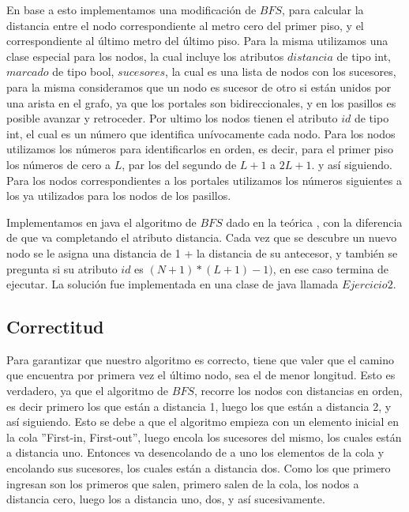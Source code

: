 En base a esto implementamos una modificación de $ BFS $, para calcular la distancia entre el nodo correspondiente al metro cero del primer piso, y el correspondiente al último metro del último piso. Para la misma utilizamos una clase especial para los nodos, la cual incluye los atributos $ distancia $ de tipo int, $  marcado$ de tipo bool, $ sucesores $, la cual es una lista de nodos con los sucesores, para la misma consideramos que un nodo es sucesor de otro si están unidos por una arista en el grafo, ya que los portales son bidireccionales, y en los pasillos es posible avanzar y retroceder. Por ultimo los nodos tienen el atributo $ id $ de tipo int, el cual es un número que identifica unívocamente cada nodo. Para los nodos utilizamos los números para identificarlos en orden, es decir, para el primer piso  los números de cero a $ L $, par los del segundo de $ L+1 $ a $ 2L+1 $. y así siguiendo. Para los nodos correspondientes a los portales utilizamos los números siguientes a los ya utilizados para los nodos de los pasillos.

Implementamos en java el algoritmo de $ BFS $ dado en la teórica \cite{teorica}, con la diferencia de que va completando el atributo distancia. Cada vez que se descubre un nuevo nodo se le asigna una distancia de 1 + la distancia de su antecesor, y también se pregunta si su atributo $ id $ es $(N+1)*(L+1)-1)$, en ese caso termina de ejecutar. La solución fue implementada en una clase de java llamada $ Ejercicio2 $.



\subsection{Correctitud}

Para garantizar que nuestro algoritmo es correcto, tiene que valer que el camino que encuentra por primera vez el último nodo, sea el de menor longitud. Esto es verdadero, ya que el algoritmo de $ BFS $, recorre los nodos con distancias en orden, es decir primero los que están a distancia 1, luego los que están a distancia 2, y así siguiendo. Esto se debe a que el algoritmo empieza con un elemento inicial en la cola ''First-in, First-out'', luego encola los sucesores del mismo, los cuales están a distancia uno. Entonces va desencolando de a uno los elementos de la cola y encolando sus sucesores, los cuales están a distancia dos. Como los que primero ingresan son los primeros que salen, primero salen de la cola, los nodos a distancia cero, luego los a distancia uno, dos, y así sucesivamente.


